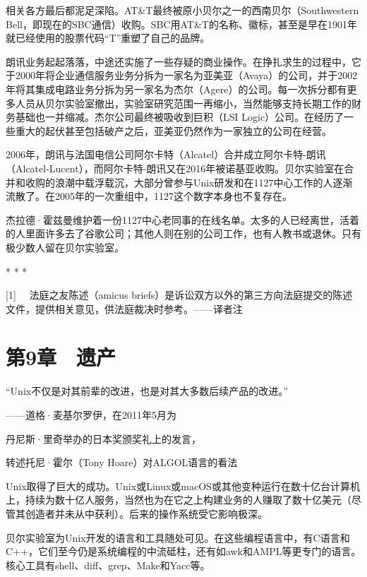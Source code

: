 \documentclass[a4paper,12pt,UTF8,twoside]{ctexbook}
\begin{document}
相关各方最后都泥足深陷。AT\&T最终被原小贝尔之一的西南贝尔（Southwestern Bell，即现在的SBC通信）收购。SBC用AT\&T的名称、徽标，甚至是早在1901年就已经使用的股票代码“T”重塑了自己的品牌。

朗讯业务起起落落，中途还实施了一些存疑的商业操作。在挣扎求生的过程中，它于2000年将企业通信服务业务分拆为一家名为亚美亚（Avaya）的公司，并于2002年将其集成电路业务分拆为另一家名为杰尔（Agere）的公司。每一次拆分都有更多人员从贝尔实验室撤出，实验室研究范围一再缩小，当然能够支持长期工作的财务基础也一并缩减。杰尔公司最终被吸收到巨积（LSI Logic）公司。在经历了一些重大的起伏甚至包括破产之后，亚美亚仍然作为一家独立的公司在经营。

2006年，朗讯与法国电信公司阿尔卡特（Alcatel）合并成立阿尔卡特-朗讯（Alcatel-Lucent），而阿尔卡特-朗讯又在2016年被诺基亚收购。贝尔实验室在合并和收购的浪潮中载浮载沉，大部分曾参与Unix研发和在1127中心工作的人逐渐流散了。在2005年的一次重组中，1127这个数字本身也不复存在。

杰拉德·霍兹曼维护着一份1127中心老同事的在线名单。太多的人已经离世，活着的人里面许多去了谷歌公司；其他人则在别的公司工作，也有人教书或退休。只有极少数人留在贝尔实验室。



* * *



[1]　 法庭之友陈述（amicus briefs）是诉讼双方以外的第三方向法庭提交的陈述文件，提供相关意见，供法庭裁决时参考。——译者注





\chapter{第9章　遗产}


“Unix不仅是对其前辈的改进，也是对其大多数后续产品的改进。”

——道格·麦基尔罗伊，在2011年5月为

丹尼斯·里奇举办的日本奖颁奖礼上的发言，

转述托尼·霍尔（Tony Hoare）对ALGOL语言的看法

Unix取得了巨大的成功。Unix或Linux或macOS或其他变种运行在数十亿台计算机上，持续为数十亿人服务，当然也为在它之上构建业务的人赚取了数十亿美元（尽管其创造者并未从中获利）。后来的操作系统受它影响极深。

贝尔实验室为Unix开发的语言和工具随处可见。在这些编程语言中，有C语言和C++，它们至今仍是系统编程的中流砥柱，还有如awk和AMPL等更专门的语言。核心工具有shell、diff、grep、Make和Yacc等。
\end{document}
